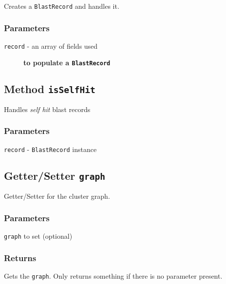 Creates a \texttt{BlastRecord} and handles it.

\subsubsection*{Parameters\label{Parameters}}
\begin{description}

\item[{\texttt{record} - an array of fields used}] \textbf{to populate a \texttt{BlastRecord}}\end{description}
\subsection*{Method \texttt{isSelfHit}\label{Method_isSelfHit}}


Handles \textit{self hit} blast records

\subsubsection*{Parameters\label{Parameters}}
\begin{description}

\item[{\texttt{record} - \texttt{BlastRecord} instance}] \mbox{}\end{description}
\subsection*{Getter/Setter \texttt{graph}\label{Getter_Setter_graph}}


Getter/Setter for the cluster graph.

\subsubsection*{Parameters\label{Parameters}}
\begin{description}

\item[{\texttt{graph} to set (optional)}] \mbox{}\end{description}
\subsubsection*{Returns\label{Returns}}


Gets the \texttt{graph}. Only returns something if there is no parameter present.

